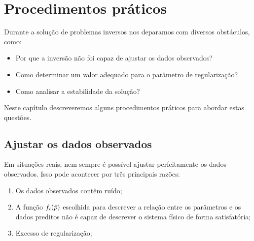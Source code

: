 \chapter{Procedimentos práticos}
\label{chap:proc_praticos}

Durante a solução de problemas inversos nos deparamos com diversos obstáculos, 
como:

\begin{itemize}
\item Por que a inversão não foi capaz de ajustar os dados observados?
\item Como determinar um valor adequado para o parâmetro de regularização?
\item Como analisar a estabilidade da solução?
\end{itemize}

\noindent Neste capítulo descreveremos alguns procedimentos práticos para abordar
estas questões.

\section{Ajustar os dados observados}

Em situações reais, nem sempre é possível ajustar perfeitamente os dados observados.
Isso pode acontecer por três principais razões:

\begin{enumerate}
\item Os dados observados contêm ruído;
\item A função $f_i(\bar{p})$ escolhida para descrever a relação entre os
parâmetros e os dados preditos não é capaz de descrever o sistema físico
de forma satisfatória;
\item Excesso de regularização;
\end{enumerate}

